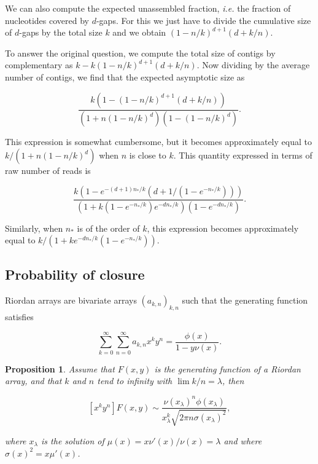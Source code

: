 \documentclass{article}
\newtheorem{proposition}{Proposition}
\begin{document}
We can also compute the expected unassembled fraction, \textit{i.e.} the
fraction of nucleotides covered by $d$-gaps. For this we just have to
divide the cumulative size of $d$-gaps by the total size $k$ and we obtain
$(1-n/k)^{d+1}(d+k/n)$.

To answer the original question, we compute the total size of contigs by
complementary as $k-k(1-n/k)^{d+1}(d+k/n)$. Now dividing by the
average number of contigs, we find that the expected asymptotic size as

\begin{equation}
\frac{k(1-(1-n/k)^{d+1}(d+k/n))}
{\left(1+n(1-n/k)^d\right)\left(1-(1-n/k)^d \right)}.
\end{equation}

This expression is somewhat cumbersome, but it becomes approximately equal
to $k/(1+n(1-n/k)^d)$ when $n$ is close to $k$. This quantity expressed in
terms of raw number of reads is

\begin{equation}
\frac{k\left( 1-e^{-(d+1)n_*/k}(d+1/(1-e^{-n_*/k})) \right)}
{( 1 + k(1-e^{-n_*/k})e^{-dn_*/k}) (1-e^{-dn_*/k})}.
\end{equation}

Similarly, when $n_*$ is of the order of $k$, this expression becomes
approximately equal to $k/(1+ke^{-dn_*/k}(1-e^{-n_*/k}))$.







\subsection{Probability of closure}
\label{sec:compass}

Riordan arrays are bivariate arrays $(a_{k,n})_{k,n}$ such that the
generating function satisfies

\begin{equation*}
\sum_{k=0}^\infty \sum_{n=0}^\infty a_{k,n} x^k y^n =
\frac{\phi(x)}{1-y \nu(x)}.
\end{equation*}

\begin{proposition}
\label{th:PW}
Assume that $F(x,y)$ is the generating function of a Riordan array, and
that $k$ and $n$ tend to infinity with $\lim k/n = \lambda$, then

\begin{equation}
\label{eq:assRA}
[x^ky^n]F(x,y) \sim \frac{\nu(x_\lambda)^n\phi(x_\lambda)}
  {x_\lambda^k\sqrt{2\pi n \sigma(x_\lambda)^2}},
\end{equation}

\noindent
where $x_\lambda$ is the solution of $\mu(x) = x\nu'(x)/\nu(x) = \lambda$
and where $\sigma(x)^2 = x \mu'(x)$.
\end{proposition}
\end{document}
